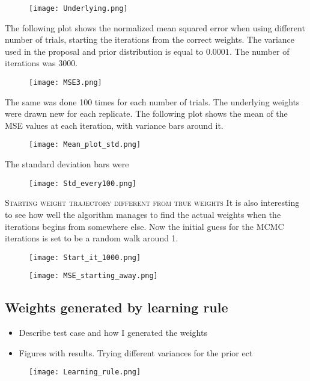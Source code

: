 \begin{figure}[hbt!]
    \centering
    \texttt{[image: Underlying.png]}
\end{figure}

The following plot shows the normalized mean squared error when using different number of trials, starting the iterations from the correct weights. The variance used in the proposal and prior distribution is equal to $0.0001$. The number of iterations was 3000.

\begin{figure}[hbt!]
    \centering
    \texttt{[image: MSE3.png]}
\end{figure}

The same was done 100 times for each number of trials. The underlying weights were drawn new for each replicate. The following plot shows the mean of the MSE values at each iteration, with variance bars around it. 

\begin{figure}[hbt!]
    \centering
    \texttt{[image: Mean\_plot\_std.png]}
\end{figure}

The standard deviation bars were 

\begin{figure}[hbt!]
    \centering
    \texttt{[image: Std\_every100.png]}
\end{figure}

\textsc{Starting weight trajectory different from true weights}
It is also interesting to see how well the algorithm manages to find the actual weights when the iterations begins from somewhere else. Now the initial guess for the MCMC iterations is set to be a random walk around 1.

\begin{figure}[hbt!]
    \centering
    \texttt{[image: Start\_it\_1000.png]}
\end{figure}


\begin{figure}[hbt!]
    \centering
    \texttt{[image: MSE\_starting\_away.png]}
\end{figure}

\subsection{Weights generated by learning rule}

\begin{itemize}
    \item Describe test case and how I generated the weights
    \item Figures with results. Trying different variances for the prior ect
\end{itemize}

\begin{figure}[hbt!]
    \centering
    \texttt{[image: Learning\_rule.png]}
\end{figure}

\cleardoublepage